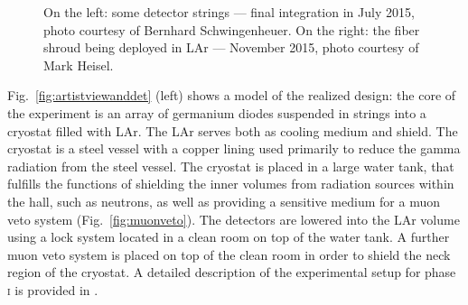 \begin{figure}
	\centering
	\caption{On the left: some detector strings --- final integration in July 2015, photo courtesy of Bernhard Schwingenheuer. On the right: the fiber shroud being deployed in LAr --- November 2015, photo courtesy of Mark Heisel.}\label{fig:stringsfibers}
\end{figure}

Fig.~\ref{fig:artistviewanddet} (left) shows a model of the realized design: the core of the experiment is an array of germanium diodes suspended in strings into a cryostat filled with LAr. The LAr serves both as cooling medium and shield. The cryostat is a steel vessel with a copper lining used primarily to reduce the gamma radiation from the steel vessel. The cryostat is placed in a large water tank, that fulfills the functions of shielding the inner volumes from radiation sources within the hall, such as neutrons, as well as providing a sensitive medium for a muon veto system (Fig.~\ref{fig:muonveto}). The detectors are lowered into the LAr volume using a lock system located in a clean room on top of the water tank. A further muon veto system is placed on top of the clean room in order to shield the neck region of the cryostat. A detailed description of the experimental setup for phase \textsc{i} is provided in \cite{gerdadescription}.

